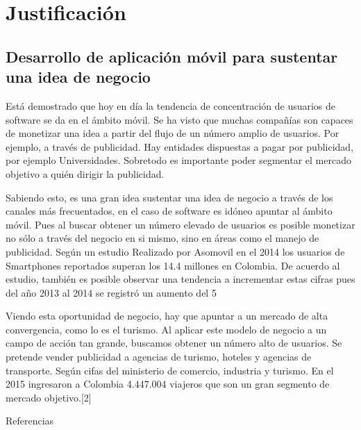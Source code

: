\chapter{Justificación}

\label{ch:background}

\section{Desarrollo de aplicación móvil para sustentar una idea de negocio}

Está demostrado que hoy en día la tendencia de concentración de usuarios de software se da en el ámbito móvil. Se ha visto que muchas compañías son capaces de monetizar una idea a partir del flujo de un número amplio de usuarios. Por ejemplo, a través de publicidad. Hay entidades dispuestas a pagar por publicidad, por ejemplo Universidades. Sobretodo es importante poder segmentar el mercado objetivo a quién dirigir la publicidad.

Sabiendo esto, es una gran idea sustentar una idea de negocio a través de los canales más frecuentados, en el caso de software es idóneo apuntar al ámbito móvil. Pues al buscar obtener un número elevado de usuarios es posible monetizar no sólo a través del negocio en si mismo, sino en áreas como el manejo de publicidad. Según un estudio Realizado por Asomovil en el 2014 los usuarios de Smartphones reportados superan los 14.4 millones en Colombia. De acuerdo al estudio, también es posible observar una tendencia a incrementar estas cifras pues del año 2013 al 2014 se registró un aumento del   5%

Viendo esta oportunidad de negocio, hay que apuntar a un mercado de alta convergencia, como lo es el turismo. Al aplicar este modelo de negocio a un campo de acción tan grande, buscamos obtener un número alto de usuarios. Se pretende vender publicidad a agencias de turismo, hoteles y agencias de transporte. Según cifas del ministerio de comercio, industria y turismo. En el 2015 ingresaron a Colombia 4.447.004 viajeros que son un gran segmento de mercado objetivo.[2]


Referencias
